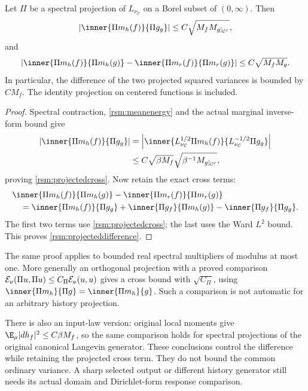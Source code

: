 \begin{theorem}
\label{rsm:projectedcomparison}
Let \(\Pi\) be a spectral projection of \(L_{\nu_{\mathcal C}}\) on a Borel subset of \((0,\infty)\). Then
\begin{equation}
 |\inner{\Pi m_h(f)}{\Pi g_g}|
 \le C\sqrt{M_fM_{g|_{\mathcal C^c}}},
 \label{rsm:projectedcross}
\end{equation}
and
\begin{equation}
 \left|
 \inner{\Pi m_h(f)}{\Pi m_h(g)}
 -
 \inner{\Pi m_r(f)}{\Pi m_r(g)}
 \right|
 \le C\sqrt{M_fM_g}.
 \label{rsm:projecteddifference}
\end{equation}
In particular, the difference of the two projected squared variances is bounded by \(CM_f\). The identity projection on centered functions is included.
\end{theorem}

\begin{proof}
Spectral contraction, \eqref{rsm:meanenergy} and the actual marginal inverse-form bound give
\begin{align*}
 |\inner{\Pi m_h(f)}{\Pi g_g}|
 &=
 \left|\inner{
 L_{\nu_{\mathcal C}}^{1/2}\Pi m_h(f)}
 {L_{\nu_{\mathcal C}}^{-1/2}\Pi g_g}\right|\\
 &\le
 C\sqrt{\beta M_f}\sqrt{\beta^{-1}M_{g|_{\mathcal C^c}}},
\end{align*}
proving \eqref{rsm:projectedcross}. Now retain the exact cross terms:
\begin{align}
 &\inner{\Pi m_h(f)}{\Pi m_h(g)}
 -
 \inner{\Pi m_r(f)}{\Pi m_r(g)}\notag\\
 &\quad=
 \inner{\Pi m_h(f)}{\Pi g_g}
 +\inner{\Pi g_f}{\Pi m_h(g)}
 -\inner{\Pi g_f}{\Pi g_g}.
 \label{rsm:exactprojecteddifference}
\end{align}
The first two terms use \eqref{rsm:projectedcross}; the last uses the Ward \(L^2\) bound. This proves \eqref{rsm:projecteddifference}.
\end{proof}

The same proof applies to bounded real spectral multipliers of modulus at most one. More generally an orthogonal projection with a proved comparison
\({\cal E}_\nu(\Pi u,\Pi u)\le C_\Pi{\cal E}_\nu(u,u)\) gives a cross bound with \(\sqrt{C_\Pi}\), using
\(\inner{\Pi m_h}{\Pi g}=\inner{\Pi m_h}{g}\).
Such a comparison is not automatic for an arbitrary history projection.

There is also an input-law version: original local moments give
\(\E_\mu|dh_f|^2\le C\beta M_f\), so the same comparison holds for spectral projections of the original canonical Langevin generator. These conclusions control the difference while retaining the projected cross term. They do not bound the common ordinary variance. A sharp selected output or different history generator still needs its actual domain and Dirichlet-form response comparison.

